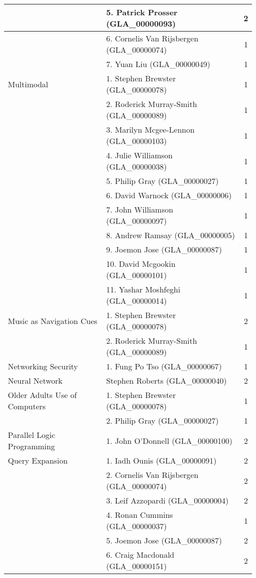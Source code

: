 \begin{longtable}{|l|l|c|}
\hline  & 5. Patrick Prosser (GLA\_00000093) & 2 \\ 
\hline  & 6. Cornelis Van Rijsbergen (GLA\_00000074) & 1 \\ 
\hline  & 7. Yuan Liu (GLA\_00000049) & 1 \\ 
\hline Multimodal & 1. Stephen Brewster (GLA\_00000078)  & 1 \\ 
\hline  & 2. Roderick Murray-Smith (GLA\_00000089) & 1 \\ 
\hline  & 3. Marilyn Mcgee-Lennon (GLA\_00000103) & 1 \\ 
\hline  & 4. Julie Williamson (GLA\_00000038) & 1 \\ 
\hline  & 5. Philip Gray (GLA\_00000027) & 1 \\ 
\hline  & 6. David Warnock (GLA\_00000006) & 1 \\ 
\hline  & 7. John Williamson (GLA\_00000097) & 1 \\ 
\hline  & 8. Andrew Ramsay (GLA\_00000005) & 1 \\ 
\hline  & 9. Joemon Jose (GLA\_00000087) & 1 \\ 
\hline  & 10. David Mcgookin (GLA\_00000101) & 1 \\ 
\hline  & 11. Yashar Moshfeghi (GLA\_00000014) & 1 \\ 
\hline Music as Navigation Cues & 1. Stephen Brewster (GLA\_00000078) & 2 \\ 
\hline  & 2. Roderick Murray-Smith (GLA\_00000089) & 1 \\ 
\hline Networking Security & 1. Fung Po Tso (GLA\_00000067) & 1 \\ 
\hline Neural Network & Stephen Roberts (GLA\_00000040) & 2 \\ 
\hline Older Adults Use of Computers & 1. Stephen Brewster (GLA\_00000078) & 1  \\ 
\hline  & 2. Philip Gray (GLA\_00000027) & 1 \\ 
\hline Parallel Logic Programming & 1. John O'Donnell (GLA\_00000100) & 2 \\ 
\hline Query Expansion & 1. Iadh Ounis (GLA\_00000091) & 2 \\ 
\hline  & 2. Cornelis Van Rijsbergen (GLA\_00000074) & 2 \\ 
\hline  & 3. Leif Azzopardi (GLA\_00000004) & 2 \\ 
\hline  & 4. Ronan Cummins (GLA\_00000037) & 1 \\ 
\hline  & 5. Joemon Jose (GLA\_00000087) & 2 \\ 
\hline  & 6. Craig Macdonald (GLA\_00000151) & 2 \\ 

\end{longtable}
